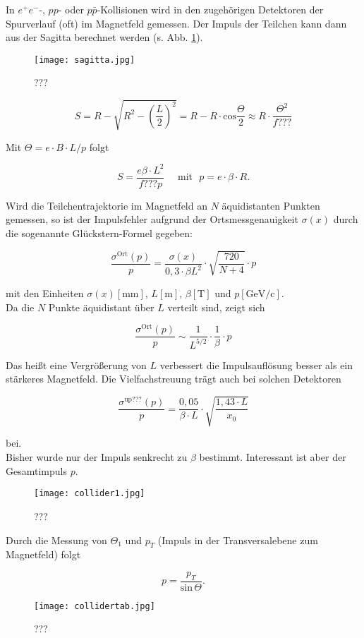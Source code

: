 In $e^+e^-$-, $pp$- oder $p\bar{p}$-Kollisionen wird in den zugehörigen Detektoren der Spurverlauf
(oft) im Magnetfeld gemessen. Der Impuls der Teilchen kann dann aus der Sagitta berechnet werden
(s. Abb. \ref{sagitta}).

\begin{figure}[H]
	\centering
	\texttt{[image: sagitta.jpg]}
	\caption{	 ???}
	\label{sagitta}
\end{figure}

\[S= R-\sqrt{R^2-\left(\frac{L}{2} \right)^2} = R-R\cdot\text{cos}\frac{\Theta}{2}\approx R\cdot
\frac{\Theta^2}{f???} \]

Mit $\Theta = e\cdot B\cdot L/p$ folgt

\[S= \frac{e\beta\cdot L^2}{f???p}~~~~~~\text{mit}~~~p=e\cdot\beta\cdot R. \]

Wird die Teilchentrajektorie im Magnetfeld an $N$ äquidistanten Punkten gemessen, so ist der
Impulsfehler aufgrund der Ortsmessgenauigkeit $\sigma(x)$ durch die sogenannte Glückstern-Formel
gegeben:

\[ \frac{\sigma^{\text{Ort}}(p)}{p} = \frac{\sigma(x)}{0{,}3\cdot\beta L^2}\cdot
\sqrt{\frac{720}{N+4}}\cdot p \]

mit den Einheiten $\sigma(x)\left[\text{mm} \right]$, $L\left[\text{m} \right]$,
$\beta\left[\text{T} \right]$ und $p\left[\text{GeV/c} \right]$.
\\
Da die $N$ Punkte äquidistant über $L$ verteilt sind, zeigt sich

\[ \frac{\sigma^{\text{Ort}}(p)}{p} \sim \frac{1}{L^{5/2}}\cdot \frac{1}{\beta}\cdot p \]

Das heißt eine Vergrößerung von $L$ verbessert die Impulsauflösung besser als ein stärkeres
Magnetfeld. Die Vielfachstreuung trägt auch bei solchen Detektoren

\[\frac{\sigma^{\text{up???}}(p)}{p} = \frac{0{,}05}{\beta \cdot L}\cdot \sqrt{\frac{1{,}43\cdot
L}{x_0}} \]

bei. 
\\
Bisher wurde nur der Impuls senkrecht zu $\beta$ bestimmt. Interessant ist aber der Gesamtimpuls
$p$. 

\begin{figure}[H]
	\centering
	\texttt{[image: collider1.jpg]}
	\caption{	 ???}
	\label{collider1}
\end{figure}

Durch die Messung von $\Theta_1$ und $p_T$ (Impuls in der Transversalebene zum Magnetfeld) folgt

\[p=\frac{p_T}{\text{sin}\,\Theta} .\]

\begin{figure}[H]
	\centering
	\texttt{[image: collidertab.jpg]}
	\caption{	 ???}
	\label{collidertab}
\end{figure}
